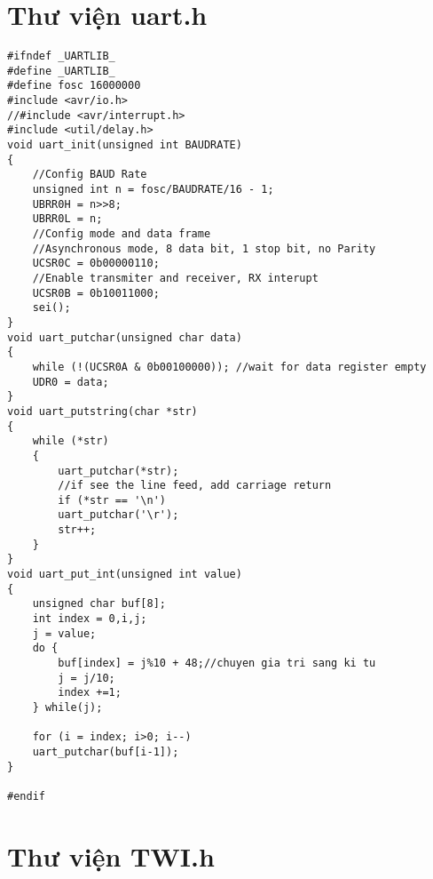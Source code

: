 \section{Thư viện uart.h}

	\begin{lstlisting}
#ifndef _UARTLIB_
#define _UARTLIB_
#define fosc 16000000
#include <avr/io.h>
//#include <avr/interrupt.h>
#include <util/delay.h>
void uart_init(unsigned int BAUDRATE)
{
	//Config BAUD Rate
	unsigned int n = fosc/BAUDRATE/16 - 1;
	UBRR0H = n>>8;
	UBRR0L = n;
	//Config mode and data frame 
	//Asynchronous mode, 8 data bit, 1 stop bit, no Parity
	UCSR0C = 0b00000110;
	//Enable transmiter and receiver, RX interupt
	UCSR0B = 0b10011000;  
	sei();
}
void uart_putchar(unsigned char data)
{
	while (!(UCSR0A & 0b00100000)); //wait for data register empty
	UDR0 = data;
}
void uart_putstring(char *str)
{
	while (*str)
	{
		uart_putchar(*str); 
		//if see the line feed, add carriage return
		if (*str == '\n')
		uart_putchar('\r');
		str++;
	}
}
void uart_put_int(unsigned int value)
{
	unsigned char buf[8];
	int index = 0,i,j;
	j = value;
	do {
		buf[index] = j%10 + 48;//chuyen gia tri sang ki tu
		j = j/10;
		index +=1;    
	} while(j);
	
	for (i = index; i>0; i--)
	uart_putchar(buf[i-1]);
}

#endif 
	\end{lstlisting}

\section{Thư viện TWI.h}

